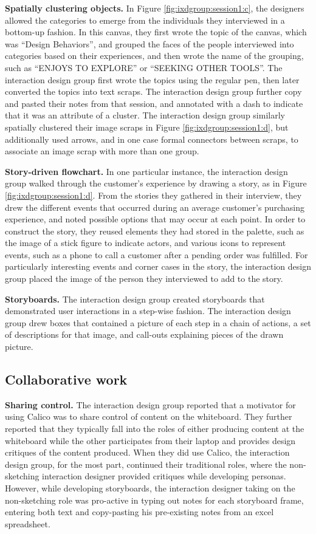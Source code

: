 \textbf{Spatially clustering objects.} In Figure \ref{fig:ixdgroup:session1:c}, the designers allowed the categories to emerge from the individuals they interviewed in a bottom-up fashion. In this canvas, they first wrote the topic of the canvas, which was ``Design Behaviors'', and grouped the faces of the people interviewed into categories based on their experiences, and then wrote the name of the grouping, such as ``ENJOYS TO EXPLORE'' or ``SEEKING OTHER TOOLS''. The interaction design group first wrote the topics using the regular pen, then later converted the topics into text scraps. The interaction design group further copy and pasted their notes from that session, and annotated with a dash to indicate that it was an attribute of a cluster. The interaction design group similarly spatially clustered their image scraps in Figure \ref{fig:ixdgroup:session1:d}, but additionally used arrows, and in one case formal connectors between scraps, to associate an image scrap with more than one group.

\textbf{Story-driven flowchart. } In one particular instance, the interaction design group walked through the customer's experience by drawing a story, as in Figure \ref{fig:ixdgroup:session1:d}. From the stories they gathered in their interview, they drew the different events that occurred during an average customer's purchasing experience, and noted possible options that may occur at each point. In order to construct the story, they reused elements they had stored in the palette, such as the image of a stick figure to indicate actors, and various icons to represent events, such as a phone to call a customer after a pending order was fulfilled. For particularly interesting events and corner cases in the story, the interaction design group placed the image of the person they interviewed to add to the story. 

\textbf{Storyboards.} The interaction design group created storyboards that demonstrated user interactions in a step-wise fashion. The interaction design group drew boxes that contained a picture of each step in a chain of actions, a set of descriptions for that image, and call-outs explaining pieces of the drawn picture.

\subsection{Collaborative work}

\textbf{Sharing control.} The interaction design group reported that a motivator for using Calico was to share control of content on the whiteboard. They further reported that they typically fall into the roles of either producing content at the whiteboard while the other participates from their laptop and provides design critiques of the content produced. When they did use Calico, the interaction design group, for the most part, continued their traditional roles, where the non-sketching interaction designer provided critiques while developing personas. However, while developing storyboards, the interaction designer taking on the non-sketching role was pro-active in typing out notes for each storyboard frame, entering both text and copy-pasting his pre-existing notes from an excel spreadsheet.

